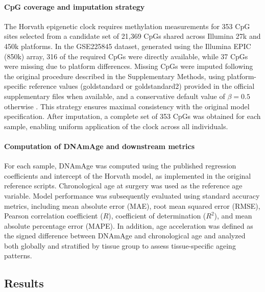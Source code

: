 \documentclass[10pt]{extarticle}
\begin{document}
\paragraph{CpG coverage and imputation strategy}
The Horvath epigenetic clock requires methylation measurements for 353 CpG sites selected from a candidate set of 21,369 CpGs shared across Illumina 27k and 450k platforms. In the GSE225845 dataset, generated using the Illumina EPIC (850k) array, 316 of the required CpGs were directly available, while 37 CpGs were missing due to platform differences. Missing CpGs were imputed following the original procedure described in the Supplementary Methods, using platform-specific reference values (goldstandard or goldstandard2) provided in the official supplementary files when available, and a conservative default value of $\beta = 0.5$ otherwise \cite{Horvath2013}. This strategy ensures maximal consistency with the original model specification. After imputation, a complete set of 353 CpGs was obtained for each sample, enabling uniform application of the clock across all individuals.

\paragraph{Computation of DNAmAge and downstream metrics}
For each sample, DNAmAge was computed using the published regression coefficients and intercept of the Horvath model, as implemented in the original reference scripts. Chronological age at surgery was used as the reference age variable. Model performance was subsequently evaluated using standard accuracy metrics, including mean absolute error (MAE), root mean squared error (RMSE), Pearson correlation coefficient ($R$), coefficient of determination ($R^2$), and mean absolute percentage error (MAPE). In addition, age acceleration was defined as the signed difference between DNAmAge and chronological age and analyzed both globally and stratified by tissue group to assess tissue-specific ageing patterns.

\subsection{Results}
\end{document}
